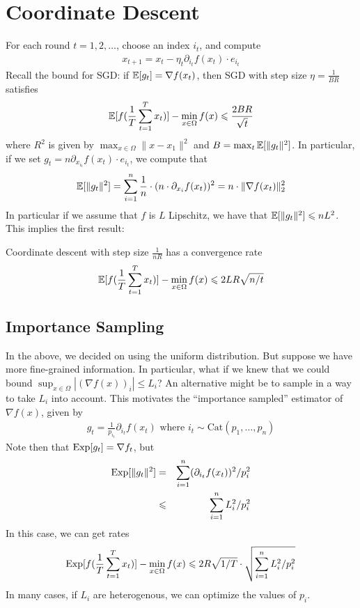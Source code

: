 \section{Coordinate Descent}
	For each round $t = 1,2,\dots$, choose an index $i_t$, and compute
	\begin{eqnarray}
	x_{t+1} = x_t - \eta_t\partial_{i_t}f(x_t) \cdot e_{i_t}
	\end{eqnarray}
	Recall the bound for SGD: if $\operatorname*{\mathbb{E}}[g_t] = \nabla f(x_t)$, then SGD with step size $\eta = \frac{1}{BR}$ satisfies
	\begin{eqnarray}
	\operatorname*{\mathbb{E}}[f(\frac{1}{T}\sum_{t=1}^T x_t)] - \min_{x \in \Omega}f(x) \leqslant \frac{2 BR}{\sqrt{t}}
	\end{eqnarray}
	where $R^2$ is given by $\max_{x \in \Omega} \|x-x_1\|^2$ and $B = \max_{t}\operatorname*{\mathbb{E}}[\|g_t\|^2]$. In particular, if we set $g_t = n \partial_{x_{i_t}}f(x_t) \cdot e_{i_t}$, we compute that
	\begin{eqnarray}
	\operatorname*{\mathbb{E}}[\|g_t\|^2] = \sum_{i=1}^n \frac{1}{n} \cdot (n\cdot \partial_{x_{i}}f(x_t))^2 = n \cdot \|\nabla f(x_t)\|^2_2
	\end{eqnarray}
	In particular if we assume that $f$ is $L$ Lipschitz, we have that 
	$\operatorname*{\mathbb{E}}[\|g_t\|^2] \leqslant nL^2$. This implies the first result:
	\begin{proposition} Coordinate descent with step size $\frac{1}{n R}$ has a convergence rate 
	\begin{eqnarray}
	\operatorname*{\mathbb{E}}[f(\frac{1}{T}\sum_{t=1}^T x_t)] - \min_{x \in \Omega}f(x) \leqslant 2LR\sqrt{n/t}
	\end{eqnarray}
	\end{proposition}
	\subsection{Importance Sampling}
	In the above, we decided on using the uniform distribution. But suppose we have more fine-grained information. In particular, what if we knew that we could bound $\sup_{x \in \Omega} |(\nabla f(x))_i| \le L_i$? An alternative might be to sample in a way to take $L_i$ into account. This motivates the ``importance sampled'' estimator of $\nabla f(x)$, given by
	\begin{eqnarray}
	g_t = \frac{1}{p_{i_t}} \partial_{i_t}f(x_{t}) \text{ where } i_t \sim \mathrm{Cat}(p_1,\dots,p_n)
	\end{eqnarray}
	Note then that $\mathrm{Exp}[g_t] = \nabla f_t$, but
	\begin{eqnarray}
	\mathrm{Exp}[\|g_t\|^2] &=& \sum_{i=1}^n (\partial_{i_t}f(x_{t}))^2/p_i^2\\
	&\leqslant& \sum_{i=1}^n L_i^2/p_i^2
	\end{eqnarray}
	In this case, we can get rates 
	\begin{eqnarray}
	\mathrm{Exp}[f(\frac{1}{T}\sum_{t=1}^T x_t)] - \min_{x \in \Omega}f(x) \leqslant 2R\sqrt{1/T}\cdot \sqrt{\sum_{i=1}^n L_i^2/p_i^2}
	\end{eqnarray}
	In many cases, if $L_i$ are heterogenous, we can optimize the values of $p_i$. 
